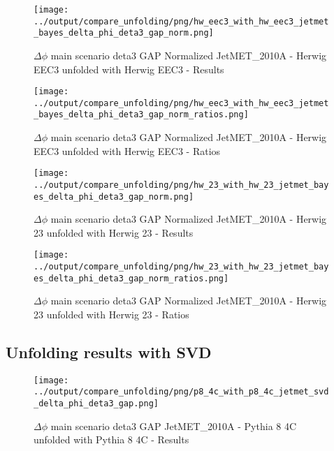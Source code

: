 \documentclass[11pt]{book}
\begin{document}
\begin{figure}[ht]
\centering
\texttt{[image: ../output/compare\_unfolding/png/hw\_eec3\_with\_hw\_eec3\_jetmet\_bayes\_delta\_phi\_deta3\_gap\_norm.png]}
\caption{$\Delta\phi$ main scenario deta3 GAP Normalized JetMET\_2010A - Herwig EEC3 unfolded with Herwig EEC3 - Results}
\label{hw_eec3_hw_eec3_jetmet_bayes_delta_phi_deta3_gap_norm_a}
\end{figure}

\begin{figure}[ht]
\centering
\texttt{[image: ../output/compare\_unfolding/png/hw\_eec3\_with\_hw\_eec3\_jetmet\_bayes\_delta\_phi\_deta3\_gap\_norm\_ratios.png]}
\caption{$\Delta\phi$ main scenario deta3 GAP Normalized JetMET\_2010A - Herwig EEC3 unfolded with Herwig EEC3 - Ratios}
\label{hw_eec3_hw_eec3_jetmet_bayes_delta_phi_deta3_gap_norm_b}
\end{figure}

\begin{figure}[ht]
\centering
\texttt{[image: ../output/compare\_unfolding/png/hw\_23\_with\_hw\_23\_jetmet\_bayes\_delta\_phi\_deta3\_gap\_norm.png]}
\caption{$\Delta\phi$ main scenario deta3 GAP Normalized JetMET\_2010A - Herwig 23 unfolded with Herwig 23 - Results}
\label{hw_23_hw_23_jetmet_bayes_delta_phi_deta3_gap_norm_a}
\end{figure}

\begin{figure}[ht]
\centering
\texttt{[image: ../output/compare\_unfolding/png/hw\_23\_with\_hw\_23\_jetmet\_bayes\_delta\_phi\_deta3\_gap\_norm\_ratios.png]}
\caption{$\Delta\phi$ main scenario deta3 GAP Normalized JetMET\_2010A - Herwig 23 unfolded with Herwig 23 - Ratios}
\label{hw_23_hw_23_jetmet_bayes_delta_phi_deta3_gap_norm_b}
\end{figure}



\clearpage
\subsection{Unfolding results with SVD}

\begin{figure}[ht]
\centering
\texttt{[image: ../output/compare\_unfolding/png/p8\_4c\_with\_p8\_4c\_jetmet\_svd\_delta\_phi\_deta3\_gap.png]}
\caption{$\Delta\phi$ main scenario deta3 GAP JetMET\_2010A - Pythia 8 4C unfolded with Pythia 8 4C - Results}
\label{p8_p8_jetmet_svd_delta_phi_deta3_gap_a}
\end{figure}
\end{document}
